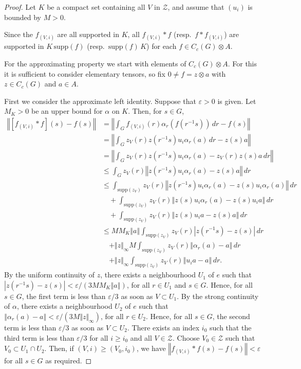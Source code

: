 \documentclass{amsart}
\theoremstyle{plain}
\theoremstyle{definition}
\numberwithin{equation}{section}
\begin{document}
\begin{proof}
Let $K$ be a compact set containing all $V$ in $\mathcal Z$, and assume that $(u_i)$ is bounded by $M>0$.

Since the $f_{(V,i)}$ are all supported in $K$, all $f_{(V,i)} * f$ (resp.\ $f * f_{(V,i)}$) are supported in $K \, {\text{supp}}(f)$ (resp.\ ${\text{supp}}(f) \, K$) for each $f\in C_c(G) \otimes A$.

For the approximating property we start with elements of $C_c(G)\otimes A$. For this it is sufficient to consider elementary tensors, so fix $0\neq f = z \otimes a$ with $z \in C_c(G)$ and $a \in A$.

First we consider the approximate left identity. Suppose that ${\varepsilon}>0$ is given. Let $M_{K}>0$ be an upper bound for $\alpha$ on $K$. Then, for $s\in G$,
\begin{align*}
{\left\Vert {[f_{(V,i)} * f](s) - f(s)} \right\Vert} &= {\left\Vert {\int_G f_{(V,i)}(r) \alpha_r(f(r^{-1}s)) \,dr - f(s)} \right\Vert} \\
&= {\left\Vert {\int_G z_V(r) z(r^{-1}s)u_i \alpha_r(a) \,dr - z(s)a} \right\Vert}  \\
&= {\left\Vert { \int_G z_V(r) z(r^{-1}s)u_i \alpha_r(a) - z_V(r) z(s)a \, dr} \right\Vert} \\
&\leq \int_G z_V(r) {\left\Vert {z(r^{-1}s)u_i \alpha_r(a) - z(s)a} \right\Vert} \,dr  \\
&\leq \int_{{\text{supp}}(z_V)} z_V(r) {\left\Vert {z(r^{-1}s)u_i\alpha_r(a) - z(s)u_i\alpha_r(a)} \right\Vert}\,dr\\
& \quad + \int_{{\text{supp}}(z_V)} z_V(r){\left\Vert {z(s)u_i\alpha_r(a) - z(s)u_i a} \right\Vert}\,dr  \\
& \quad + \int_{{\text{supp}}(z_V)} z_V(r){\left\Vert {z(s)u_i a - z(s)a} \right\Vert} \,dr \\
&\leq MM_{K}{\left\Vert {a} \right\Vert}\int_{{\text{supp}}(z_V)} z_V(r) |z(r^{-1}s) - z(s)|\,dr \\
& \quad + \Vert z\Vert_\infty M\int_{{\text{supp}}(z_V)} z_V(r){\left\Vert {\alpha_r(a)-a} \right\Vert}\,dr \\
& \quad + \Vert z\Vert_\infty \int_{{\text{supp}}(z_V)} z_V(r) {\left\Vert {u_i a -a} \right\Vert}\,dr.
\end{align*}
By the uniform continuity of $z$, there exists a neighbourhood $U_1$ of $e$ such that $|z(r^{-1}s) - z(s)|<{\varepsilon}/(3MM_{K}{\left\Vert {a} \right\Vert})$, for all $r\in U_1$ and $s\in G$. Hence, for all $s\in G$, the first term is less than ${\varepsilon}/3$ as soon as $V\subset U_1$. By the strong continuity of $\alpha$, there exists a neighbourhood $U_2$ of $e$ such that ${\left\Vert {\alpha_r(a)-a} \right\Vert}<{\varepsilon}/(3M\Vert z\Vert_\infty)$, for all $r\in U_2$. Hence, for all $s\in G$, the second term is less than ${\varepsilon}/3$ as soon as $V\subset U_2$. There exists an index $i_0$ such that the third term is less than ${\varepsilon} / 3$ for all $i\geq i_0$ and all $V\in\mathcal Z$. Choose $V_0\in\mathcal Z$ such that $V_0\subset U_1\cap U_2$. Then, if $(V,i)\geq (V_0,i_0)$, we have ${\left\Vert {f_{(V,i)} * f(s) - f(s)} \right\Vert}<{\varepsilon}$ for all $s\in G$ as required.


\end{proof}
\end{document}
